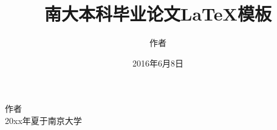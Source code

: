\documentclass[winfonts,master,oneside,nobackinfo]{njuthesis}
\title{南大本科毕业论文\LaTeX 模板}
\author{作者}
\institute{南京大学}
\date{2016年6月8日}
\begin{document}

\maketitle
\makeenglishtitle


\frontmatter

\begin{abstract}
\lipsum[1-2]


\end{abstract}

\begin{englishabstract}
\lipsum[2]


\end{englishabstract}

%
\begin{preface}
\lipsum[1]
\vspace{1cm}
\begin{flushright}
作者\\
20xx年夏于南京大学
\end{flushright}

\end{preface}

\tableofcontents

\listoffigures

\listoftables
\end{document}
